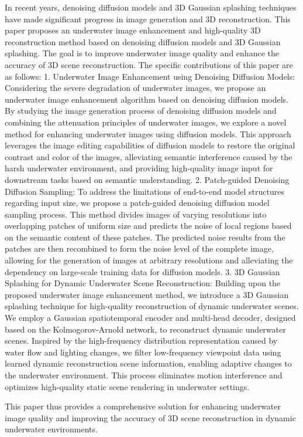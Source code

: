 \begin{abstract*}
  In recent years, denoising diffusion models and 3D Gaussian splashing techniques have made significant progress in image generation and 3D reconstruction. This paper proposes an underwater image enhancement and high-quality 3D reconstruction method based on denoising diffusion models and 3D Gaussian splashing. The goal is to improve underwater image quality and enhance the accuracy of 3D scene reconstruction. The specific contributions of this paper are as follows:
	1.	Underwater Image Enhancement using Denoising Diffusion Models: Considering the severe degradation of underwater images, we propose an underwater image enhancement algorithm based on denoising diffusion models. By studying the image generation process of denoising diffusion models and combining the attenuation principles of underwater images, we explore a novel method for enhancing underwater images using diffusion models. This approach leverages the image editing capabilities of diffusion models to restore the original contrast and color of the images, alleviating semantic interference caused by the harsh underwater environment, and providing high-quality image input for downstream tasks based on semantic understanding.
	2.	Patch-guided Denoising Diffusion Sampling: To address the limitations of end-to-end model structures regarding input size, we propose a patch-guided denoising diffusion model sampling process. This method divides images of varying resolutions into overlapping patches of uniform size and predicts the noise of local regions based on the semantic content of these patches. The predicted noise results from the patches are then recombined to form the noise level of the complete image, allowing for the generation of images at arbitrary resolutions and alleviating the dependency on large-scale training data for diffusion models.
	3.	3D Gaussian Splashing for Dynamic Underwater Scene Reconstruction: Building upon the proposed underwater image enhancement method, we introduce a 3D Gaussian splashing technique for high-quality reconstruction of dynamic underwater scenes. We employ a Gaussian spatiotemporal encoder and multi-head decoder, designed based on the Kolmogorov-Arnold network, to reconstruct dynamic underwater scenes. Inspired by the high-frequency distribution representation caused by water flow and lighting changes, we filter low-frequency viewpoint data using learned dynamic reconstruction scene information, enabling adaptive changes to the underwater environment. This process eliminates motion interference and optimizes high-quality static scene rendering in underwater settings.

  This paper thus provides a comprehensive solution for enhancing underwater image quality and improving the accuracy of 3D scene reconstruction in dynamic underwater environments.
\end{abstract*}
